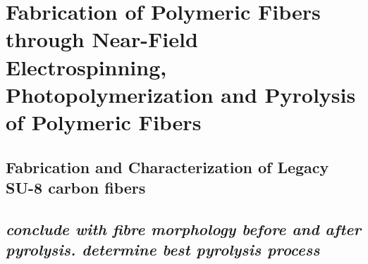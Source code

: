 
\chapter{Fabrication of Polymeric Fibers through Near-Field Electrospinning, Photopolymerization and Pyrolysis of Polymeric Fibers} %

\label{Chapter:4}

\section{}



\section{}



\section{Fabrication and Characterization of Legacy SU-8 carbon fibers}



\section{\emph{conclude with fibre morphology before and after pyrolysis. determine best pyrolysis process}}
